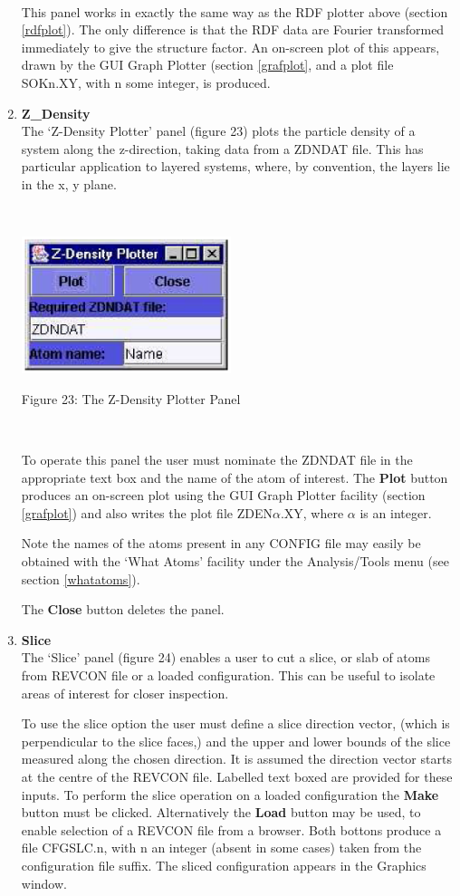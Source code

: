 \begin{enumerate}
~

\noindent
This panel works in exactly the same way as the RDF plotter above
(section \ref{rdfplot}). The only difference is that the RDF data are
Fourier transformed immediately to give the structure factor. An
on-screen plot of this appears, drawn by the GUI Graph Plotter
(section \ref{grafplot}, and a plot file SOKn.XY, with n some integer,
is produced.

\item {\bf Z\_Density}\\
The `Z-Density Plotter' panel (figure 23) plots the particle density
of a system along the z-direction, taking data from a \DD{} ZDNDAT
file. This has particular application to layered systems, where, by
convention, the layers lie in the x, y plane.

~

\vskip 5mm
\centerline{\includegraphics[height=4.0cm]{zdenplot.ps}}
\centerline{Figure 23: The Z-Density Plotter Panel}
\vskip 5mm

~

\noindent
To operate this panel the user must nominate the ZDNDAT file in the
appropriate text box and the name of the atom of interest. The {\bf
Plot} button produces an on-screen plot using the GUI Graph Plotter
facility (section \ref{grafplot}) and also writes the plot file
ZDEN$\alpha$.XY, where $\alpha$ is an integer.

Note the names of the atoms present in any CONFIG file may easily be
obtained with the `What Atoms' facility under the Analysis/Tools menu
(see section \ref{whatatoms}).

The {\bf Close} button deletes the panel.
\item {\bf Slice}\\
The `Slice' panel (figure 24) enables a user to cut a slice, or slab
of atoms from REVCON file or a loaded configuration. This can be
useful to isolate areas of interest for closer inspection.

To use the slice option the user must define a slice direction vector,
(which is perpendicular to the slice faces,) and the upper and lower
bounds of the slice measured along the chosen direction. It is assumed
the direction vector starts at the centre of the REVCON file. Labelled
text boxed are provided for these inputs.  To perform the slice
operation on a loaded configuration the {\bf Make} button must be
clicked. Alternatively the {\bf Load} button may be used, to enable
selection of a REVCON file from a browser. Both bottons produce a file
CFGSLC.n, with n an integer (absent in some cases) taken from the
configuration file suffix. The sliced configuration appears in the
Graphics window.


\end{enumerate}
